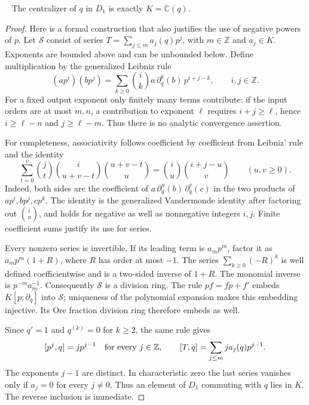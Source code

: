 \begin{lemma}\ours\ \label{lem:coordinate-centralizer}
The centralizer of \(q\) in \(D_1\) is exactly \(K=\mathbb C(q)\).
\end{lemma}
\begin{proof}
Here is a formal construction that also justifies the use of negative
powers of \(p\). Let \(\mathcal S\) consist of series
\(T=\sum_{j\leq m}a_j(q)p^j\), with \(m\in\mathbb Z\) and
\(a_j\in K\). Exponents are bounded above and can be unbounded below.
Define multiplication by the generalized Leibniz rule
\[
 (ap^i)(bp^j)=\sum_{k\geq0}\binom{i}{k}a\,\partial_q^k(b)\,p^{i+j-k},
 \qquad i,j\in\mathbb Z.
\]
For a fixed output exponent only finitely many terms contribute: if the
input orders are at most \(m,n\), a contribution to exponent \(\ell\)
requires \(i+j\geq\ell\), hence \(i\geq\ell-n\) and
\(j\geq\ell-m\). Thus there is no analytic convergence assertion.

For completeness, associativity follows coefficient by coefficient from
Leibniz' rule and the identity
\[
 \sum_{t=0}^{v}\binom jt\binom i{u+v-t}\binom{u+v-t}u
 =\binom iu\binom{i+j-u}v
 \qquad(u,v\geq0).
\]
Indeed, both sides are the coefficient of
\(a\,\partial_q^u(b)\,\partial_q^v(c)\) in the two products of
\(ap^i,bp^j,cp^k\). The identity is the generalized Vandermonde identity
after factoring out \(\binom iu\), and holds for negative as well as
nonnegative integers \(i,j\). Finite coefficient sums justify its use for
series.

Every nonzero series is invertible. If its leading term is \(a_mp^m\),
factor it as \(a_mp^m(1+R)\), where \(R\) has order at most \(-1\).
The series \(\sum_{k\geq0}(-R)^k\) is well defined coefficientwise and is
a two-sided inverse of \(1+R\). The monomial inverse is
\(p^{-m}a_m^{-1}\). Consequently \(\mathcal S\) is a division ring.
The rule \(pf=fp+f'\) embeds \(K[p;\partial_q]\) into \(\mathcal S\);
uniqueness of the polynomial expansion makes this embedding injective.
Its Ore fraction division ring therefore embeds as well.

Since \(q'=1\) and \(q^{(k)}=0\) for \(k\geq2\), the same rule gives
\[
 [p^j,q]=jp^{j-1}\quad\hbox{for every }j\in\mathbb Z,
 \qquad
 [T,q]=\sum_{j\leq m}j a_j(q)p^{j-1}.
\]
The exponents \(j-1\) are distinct. In characteristic zero the last
series vanishes only if \(a_j=0\) for every \(j\ne0\). Thus an element
of \(D_1\) commuting with \(q\) lies in \(K\). The reverse inclusion
is immediate.
\end{proof}

